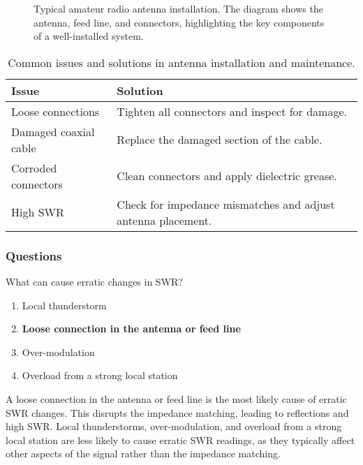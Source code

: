 \begin{figure}[h]
    \centering
    \caption{Typical amateur radio antenna installation. The diagram shows the antenna, feed line, and connectors, highlighting the key components of a well-installed system.}
    \label{fig:antenna-installation}
\end{figure}

\begin{table}[h]
    \centering
    \begin{tabular}{|l|l|}
        \hline
        \textbf{Issue} & \textbf{Solution} \\
        \hline
        Loose connections & Tighten all connectors and inspect for damage. \\
        Damaged coaxial cable & Replace the damaged section of the cable. \\
        Corroded connectors & Clean connectors and apply dielectric grease. \\
        High SWR & Check for impedance mismatches and adjust antenna placement. \\
        \hline
    \end{tabular}
    \caption{Common issues and solutions in antenna installation and maintenance.}
    \label{tab:antenna-issues}
\end{table}

\subsubsection*{Questions}
\begin{tcolorbox}[colback=gray!10!white,colframe=black!75!black,title={T9B09}]
    What can cause erratic changes in SWR?
    \begin{enumerate}[label=\Alph*),noitemsep]
        \item Local thunderstorm
        \item \textbf{Loose connection in the antenna or feed line}
        \item Over-modulation
        \item Overload from a strong local station
    \end{enumerate}
\end{tcolorbox}

A loose connection in the antenna or feed line is the most likely cause of erratic SWR changes. This disrupts the impedance matching, leading to reflections and high SWR. Local thunderstorms, over-modulation, and overload from a strong local station are less likely to cause erratic SWR readings, as they typically affect other aspects of the signal rather than the impedance matching.
